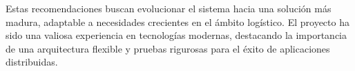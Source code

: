 \documentclass[a4paper,12pt]{article}
\begin{document}
Estas recomendaciones buscan evolucionar el sistema hacia una solución más madura, adaptable a necesidades crecientes en el ámbito logístico. El proyecto ha sido una valiosa experiencia en tecnologías modernas, destacando la importancia de una arquitectura flexible y pruebas rigurosas para el éxito de aplicaciones distribuidas.
\end{document}
